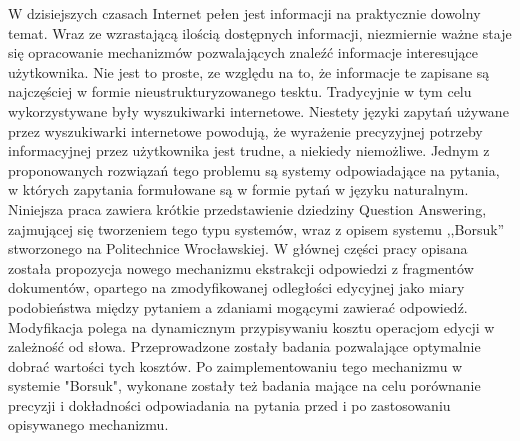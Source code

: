 \documentclass[a4paper, twoside, 12pt]{report}
\newenvironment{abstractpage}
  {\vspace*{\fill}\thispagestyle{empty}}
    {\vfill}
\renewenvironment{abstract}[1]
      {\bigskip\selectlanguage{#1}%
             \begin{center}\bfseries\abstractname\end{center}}
           {\par\bigskip}
\begin{document}
% 


\begin{abstractpage}
\begin{abstract}{polish}
    W dzisiejszych czasach Internet pełen jest informacji na praktycznie dowolny temat. Wraz ze wzrastającą ilością
    dostępnych informacji, niezmiernie ważne staje się opracowanie mechanizmów pozwalających znaleźć informacje
    interesujące użytkownika. Nie jest to proste, ze względu na to, że informacje te zapisane są najczęściej w formie
    nieustrukturyzowanego tesktu. Tradycyjnie w tym celu wykorzystywane były wyszukiwarki internetowe. Niestety
    języki zapytań używane przez wyszukiwarki internetowe powodują, że wyrażenie precyzyjnej potrzeby informacyjnej
    przez użytkownika jest trudne, a niekiedy niemożliwe. Jednym z proponowanych rozwiązań tego problemu są systemy
    odpowiadające na pytania, w których zapytania formułowane są w formie pytań w języku naturalnym. Niniejsza
    praca zawiera krótkie przedstawienie dziedziny Question Answering, zajmującej się tworzeniem tego typu systemów,
    wraz z opisem systemu ,,Borsuk'' stworzonego na Politechnice Wrocławskiej.
    W głównej części pracy opisana została propozycja nowego mechanizmu ekstrakcji odpowiedzi z fragmentów dokumentów,
    opartego na zmodyfikowanej odległości edycyjnej jako miary podobieństwa między pytaniem a zdaniami mogącymi zawierać
    odpowiedź. Modyfikacja polega na dynamicznym przypisywaniu kosztu operacjom edycji w zależność od słowa. Przeprowadzone
    zostały badania pozwalające optymalnie dobrać wartości tych kosztów. Po zaimplementowaniu tego mechanizmu w systemie "Borsuk",
    wykonane zostały też badania mające na celu porównanie precyzji i dokładności odpowiadania na pytania przed i po
    zastosowaniu opisywanego mechanizmu.
\end{abstract}


\end{abstractpage}
\end{document}
